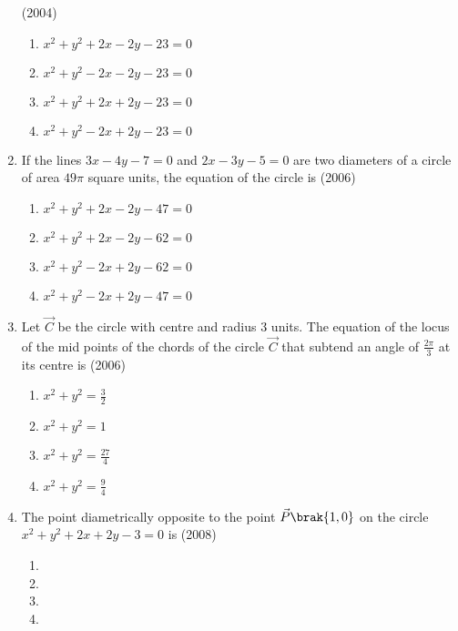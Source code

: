 \begin{enumerate}
\hfill{(2004)}
\begin{multicols}{2}
\begin{enumerate}
\item $x^2+y^2+2x-2y-23=0$
\item $x^2+y^2-2x-2y-23=0$
\item $x^2+y^2+2x+2y-23=0$
\item $x^2+y^2-2x+2y-23=0$
\end{enumerate}
\end{multicols}
\item If the lines $3x-4y-7=0$ and $2x-3y-5=0$ are two diameters of a circle of area $49\pi$ square units,  the equation of the circle is 
\hfill{(2006)}
\begin{multicols}{2}
\begin{enumerate}
\item $x^2+y^2+2x-2y-47=0$
\item $x^2+y^2+2x-2y-62=0$
\item $x^2+y^2-2x+2y-62=0$
\item $x^2+y^2-2x+2y-47=0$
\end{enumerate}
\end{multicols}
\item Let $\vec{C}$ be the circle with centre  and radius 3 units. The equation of the locus of the mid points of the chords of the circle $\vec{C}$ that subtend an angle of $\frac{2\pi}{3}$ at its centre is
\hfill{(2006)}
\begin{multicols}{4}
\begin{enumerate}
\item $x^2+y^2=\frac{3}{2}$
\item $x^2+y^2=1$
\item $x^2+y^2=\frac{27}{4}$
\item $x^2+y^2=\frac{9}{4}$
\end{enumerate}
\end{multicols}
\item The point diametrically opposite to the point $\vec{P}\brak{1, 0}$ on the circle $x^2+y^2+2x+2y-3=0$ is 
\hfill{(2008)}
\begin{multicols}{4}
\begin{enumerate}
\item {}
\item {}
\item {}
\item {}
\end{enumerate}
\end{multicols}

\end{enumerate}
